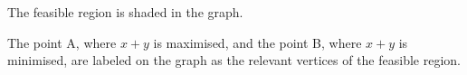 \begin{subquestions}
\begin{subsubquestions}

\subsubquestion

The feasible region is shaded in the graph.


\subsubquestion

The point A, where $x+y$ is maximised, and the point B, where $x+y$ is minimised, are labeled on the graph as the relevant vertices of the feasible region.

\end{subsubquestions}

\end{subquestions}
